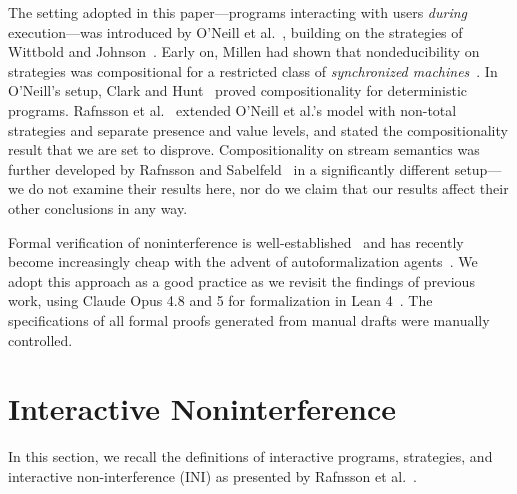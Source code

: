 \documentclass[preprint,5p,twocolumn]{elsarticle}
\begin{document}
The setting adopted in this paper---programs interacting with users \emph{during} execution---was
introduced by O'Neill et al.~\cite{ONeill2006}, building on the strategies of Wittbold and
Johnson~\cite{Wittbold1990}. Early on, Millen had shown that nondeducibility on strategies
was compositional for a restricted class of \emph{synchronized machines}~\cite{Millen1990}.
In O'Neill's setup, Clark and Hunt~\cite{Clark2008} proved compositionality for deterministic programs.
Rafnsson et al.~\cite{Rafnsson2012,Rafnsson2014} extended O'Neill et al.'s model
with non-total strategies and separate presence and value levels, and stated the
compositionality result that we are set to disprove.
Compositionality on stream semantics was further developed by Rafnsson and
Sabelfeld~\cite{RafnssonSabelfeld2014} in a significantly different setup---we do not examine their
results here, nor do we claim that our results affect their other conclusions in any way.

Formal verification of noninterference is well-established~\cite{Popescu2012,Popescu2013,Murray2016}
and has recently become increasingly cheap with the advent of autoformalization agents~\cite{Wu2022}.
We adopt this approach as a good practice as we revisit the findings of previous work,
using Claude Opus 4.8 and 5 for formalization in Lean 4~\cite{Moura2021}. The specifications of
all formal proofs generated from manual drafts were manually controlled.


\section{Interactive Noninterference}

\label{sec:preliminaries}

\newcommand{\Strat}{\mathbf{Strat}}
\newcommand{\StratT}{\mathbf{Strat}_{\mathrm{T}}}
\newcommand{\StratNI}{\mathbf{Strat}\text{-}\mathrm{NI}}
\newcommand{\StratTNI}{\mathbf{Strat}_{\mathrm{T}}\text{-}\mathrm{NI}}
\newcommand{\States}{\mathbb{S}}
\newcommand{\IO}{\mathrm{IO}}
\newcommand{\Channels}{\mathbb{C}}
\newcommand{\Values}{\mathbb{V}}
\newcommand{\Traces}{\mathbb{T}}

In this section, we recall the definitions of interactive programs, strategies, and interactive non-interference (INI) as presented by Rafnsson et al.~\cite{Rafnsson2012}. %
\end{document}
